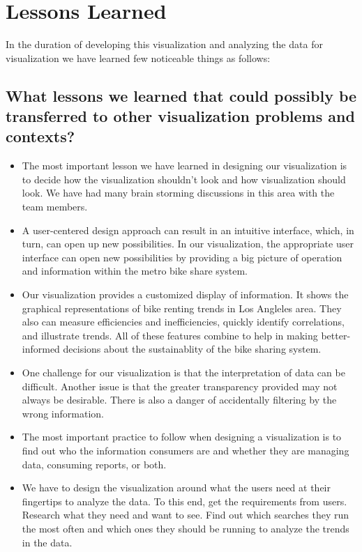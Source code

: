 \section{Lessons Learned} 
\label{sec:lessons_learned}

In the duration of developing this visualization and analyzing the data for visualization we have learned few noticeable things as follows:

\subsection{What lessons we learned that could possibly be transferred to other visualization problems and contexts?}

\begin{itemize}
\item The most important lesson we have learned in designing our visualization is to decide how the visualization shouldn't look and how visualization should look. We have had many brain storming discussions in this area with the team members.
\item A user-centered design approach can result in an intuitive interface, which, in turn, can open up new possibilities. In our visualization, the appropriate user interface can open new possibilities by providing a big picture of operation and information within the metro bike share system.
\item Our visualization provides a customized display of information. It shows the graphical representations of bike renting trends in Los Angleles area. They also can measure efficiencies and inefficiencies, quickly identify correlations, and illustrate trends. All of these features combine to help in making better-informed decisions about the sustainablity of the bike sharing system.
\item One challenge for our visualization is that the interpretation of data can be difficult. Another issue is that the greater transparency provided may not always be desirable. There is also a danger of accidentally filtering by the wrong information. 
\item The most important practice to follow when designing a visualization is to find out who the information consumers are and whether they are managing data, consuming reports, or both. 
\item We have to design the visualization around what the users need at their fingertips to analyze the data. To this end, get the requirements from users. Research what they need and want to see. Find out which searches they run the most often and which ones they should be running to analyze the trends in the data.

\end{itemize}
